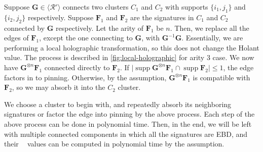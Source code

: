 \documentclass[11pt]{article}
\DeclareMathOperator{\holbs}{Holant^*_2}
\DeclareMathOperator{\supp}{supp}
\newcommand{\strspt}{\textsf{EBD}\xspace}
\begin{document}
Suppose $\mathbf{G} \in \langle \mathcal{R}' \rangle$ connects two clusters $C_1$ and $C_2$ with supports $\{i_1, j_1\}$ and $\{i_2, j_2\}$ respectively.
Suppose $\mathbf{F}_1$ and $\mathbf{F}_2$ are the signatures in $C_1$ and $C_2$ connected by $\mathbf{G}$ respectively.
Let the arity of $\mathbf{F}_1$ be $n$.
Then, we replace all the edges of $\mathbf{F}_1$, except the one connecting to $\mathbf{G}$, with $\mathbf{G}^{-1} \mathbf{G} $.
Essentially, we are performing a local holographic transformation, so this does not change the Holant value.
The process is described in \cref{fig:local-holographic} for arity $3$ case.
We now have $\mathbf{G}^{\otimes n} \mathbf{F}_1$ connected directly to $\mathbf{F}_2$.
If $\lvert \supp \mathbf{G}^{\otimes n} \mathbf{F}_1 \cap \supp \mathbf{F}_2 \rvert \le 1$, the edge factors in to pinning.
Otherwise, by the assumption, $\mathbf{G}^{\otimes n} \mathbf{F}_1$ is compatible with $\mathbf{F}_2$, so we may absorb it into the $C_2$ cluster.

We choose a cluster to begin with, and repeatedly absorb its neighboring signatures or factor the edge into pinning by the above process.
Each step of the above process can be done in polynomial time.
Then, in the end, we will be left with multiple connected components in which all the signatures are \strspt, and their $\holbs$ values can be computed in polynomial time by the assumption.
\end{document}

